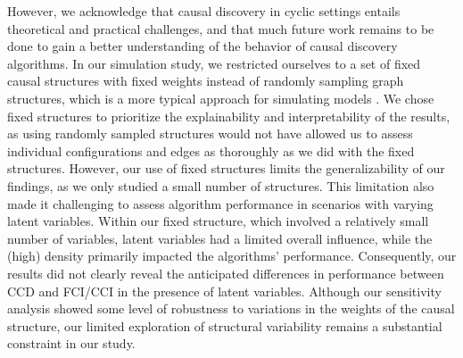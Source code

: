 \documentclass[twoside, 11pt]{article}
\begin{document}
However, we acknowledge that causal discovery in cyclic settings entails theoretical and practical challenges, and that much future work remains to be done to gain a better understanding of the behavior of causal discovery algorithms.
In our simulation study, we restricted ourselves to a set of fixed causal structures with fixed weights instead of randomly sampling graph structures, which is a more typical approach for simulating models \citep{mooij_joint_2020, strobl2019, diego2012}. We chose fixed structures to prioritize the explainability and interpretability of the results, as using randomly sampled structures would not have allowed us to assess individual configurations and edges as thoroughly as we did with the fixed structures.
However, our use of fixed structures limits the generalizability of our findings, as we only studied a small number of structures. This limitation also made it challenging to assess algorithm performance in scenarios with varying latent variables. Within our fixed structure, which involved a relatively small number of variables, latent variables had a limited overall influence, while the (high) density primarily impacted the algorithms' performance. Consequently, our results did not clearly reveal the anticipated differences in performance between CCD and FCI/CCI in the presence of latent variables. Although our sensitivity analysis showed some level of robustness to variations in the weights of the causal structure, our limited exploration of structural variability remains a substantial constraint in our study.
\end{document}
